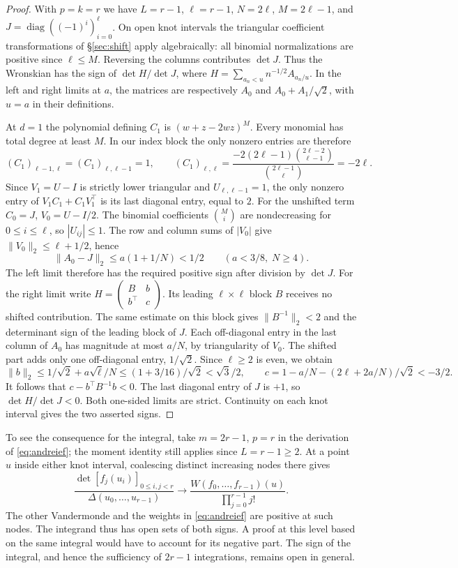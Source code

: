 \documentclass[11pt,a4paper,reqno]{amsart}
\numberwithin{equation}{section}
\begin{document}
\begin{proof}
With \(p=k=r\) we have \(L=r-1\), \(\ell=r-1\), \(N=2\ell\), \(M=2\ell-1\), and \(J=\operatorname{diag}((-1)^i)_{i=0}^{\ell}\). On open knot intervals the triangular coefficient transformations of \S\ref{sec:shift} apply algebraically: all binomial normalizations are positive since \(\ell\le M\). Reversing the columns contributes \(\det J\). Thus the Wronskian has the sign of \(\det H/\det J\), where \(H=\sum_{a_n<u}n^{-1/2}A_{a_n/u}\). In the left and right limits at \(a\), the matrices are respectively \(A_0\) and \(A_0+A_1/\sqrt2\), with \(u=a\) in their definitions.

At \(d=1\) the polynomial defining \(C_1\) is \((w+z-2wz)^M\). Every monomial has total degree at least \(M\). In our index block the only nonzero entries are therefore
\[
 (C_1)_{\ell-1,\ell}=(C_1)_{\ell,\ell-1}=1,\qquad
 (C_1)_{\ell,\ell}=
 \frac{-2(2\ell-1)\binom{2\ell-2}{\ell-1}}{\binom{2\ell-1}{\ell}}=-2\ell .
\]
Since \(V_1=U-I\) is strictly lower triangular and \(U_{\ell,\ell-1}=1\), the only nonzero entry of \(V_1 C_1+C_1V_1^\top\) is its last diagonal entry, equal to \(2\). For the unshifted term \(C_0=J\), \(V_0=U-I/2\). The binomial coefficients \(\binom Mi\) are nondecreasing for \(0\le i\le\ell\), so \(|U_{ij}|\le1\). The row and column sums of \(|V_0|\) give \(\|V_0\|_2\le\ell+1/2\), hence
\[
 \|A_0-J\|_2\le a(1+1/N)<1/2 \qquad (a<3/8,\;N\ge4).
\]
The left limit therefore has the required positive sign after division by \(\det J\). For the right limit write \(H=\left(\begin{smallmatrix} B&b\\ b^\top&c\end{smallmatrix}\right)\). Its leading \(\ell\times\ell\) block \(B\) receives no shifted contribution. The same estimate on this block gives \(\|B^{-1}\|_2<2\) and the determinant sign of the leading block of \(J\). Each off-diagonal entry in the last column of \(A_0\) has magnitude at most \(a/N\), by triangularity of \(V_0\). The shifted part adds only one off-diagonal entry, \(1/\sqrt2\). Since \(\ell\ge2\) is even, we obtain
\[
 \|b\|_2\le 1/\sqrt2+a\sqrt\ell/N\le (1+3/16)/\sqrt2<\sqrt3/2,
 \qquad
 c=1-a/N-(2\ell+2a/N)/\sqrt2<-3/2.
\]
It follows that \(c-b^\top B^{-1}b<0\). The last diagonal entry of \(J\) is \(+1\), so \(\det H/\det J<0\). Both one-sided limits are strict. Continuity on each knot interval gives the two asserted signs.
\end{proof}

To see the consequence for the integral, take \(m=2r-1\), \(p=r\) in the derivation of \eqref{eq:andreief}; the moment identity still applies since \(L=r-1\ge2\). At a point \(u\) inside either knot interval, coalescing distinct increasing nodes there gives
\[
 \frac{\det[f_j(u_i)]_{0\le i,j<r}}{\Delta(u_0,\ldots,u_{r-1})}
 \longrightarrow
 \frac{W(f_0,\ldots,f_{r-1})(u)}{\prod_{j=0}^{r-1}j!}.
\]
The other Vandermonde and the weights in \eqref{eq:andreief} are positive at such nodes. The integrand thus has open sets of both signs. A proof at this level based on the same integral would have to account for its negative part. The sign of the integral, and hence the sufficiency of \(2r-1\) integrations, remains open in general.
\end{document}

